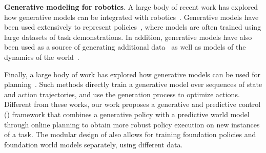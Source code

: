 \textbf{Generative modeling for robotics}. A large body of recent work has explored how generative models can be integrated with robotics~\cite{urain2024deep}. Generative models have been used extensively to represent policies~\cite{mandlekar2020iris, lynch2020learning, jang2022bc, chi2023diffusion, brohan2023rt, ankile2024imitation, lee2024behavior, jiang2022vima}, where models are often trained using large datasets of task demonstrations. In addition, generative models have also been used as a source of generating additional data~\cite{wang2023robogen, wang2023gensim, chen2023genaug} as well as models of the dynamics of the world~\cite{liu2022structdiffusion,byravan2017se3, yang2023learning}.


 
 
Finally, a large body of work has explored how generative models can be used for planning~\cite{janner2022planning, ajay2022conditional, yang2024diffusion, carvalho2023motion, luo2024potential}. Such methods directly train a generative model over sequences of state and action trajectories, and use the generation process to optimize actions. Different from these works, our work proposes a generative and predictive control (\nameshort) framework that combines a generative policy with a predictive world model through online planning to obtain more robust policy execution on new instances of a task. The modular design of \nameshort also allows for training foundation policies and foundation world models separately, using different data.





